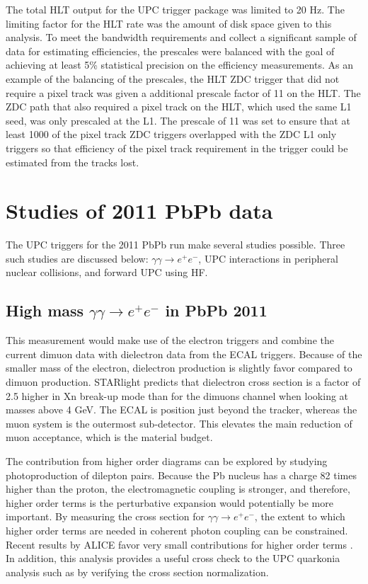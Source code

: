     The total HLT output for the UPC trigger package was limited to 20 Hz. 
    The limiting factor for the HLT rate was the amount of disk space given 
      to this analysis. 
    To meet the bandwidth requirements and collect a significant sample
      of data for estimating efficiencies, the prescales were balanced with 
      the goal of achieving at least 5\% statistical precision on the 
      efficiency measurements. 
    As an example of the balancing of the prescales, the HLT  ZDC trigger that 
      did not require a pixel track was given a additional prescale factor 
      of 11 on the HLT.
    The ZDC path that also required a pixel track on the HLT, which used 
      the same L1 seed, was only prescaled at the L1.
    The prescale of 11 was set to ensure that at least 1000 of the pixel track 
      ZDC triggers overlapped with the ZDC L1 only triggers so that efficiency
      of the pixel track requirement in the trigger could be estimated from 
      the tracks lost.

  \section{Studies of 2011 PbPb data}
    The UPC triggers for the 2011 PbPb run make several studies possible.
    Three such studies are discussed below: $\gamma\gamma \rightarrow e^{+} 
      e^{-}$, UPC interactions in peripheral nuclear collisions, and forward
      UPC \JPsi{} using HF. 

    \subsection{High mass $\gamma\gamma \rightarrow e^{+} e^{-}$  in PbPb 2011}
      This measurement would make use of the electron triggers and combine the 
        current dimuon data with dielectron data from the ECAL triggers.
      Because of the smaller mass of the electron,
        dielectron production is slightly favor compared to dimuon 
        production.
      STARlight predicts that dielectron cross section is a factor of 
        2.5 higher in Xn break-up mode than for the dimuons channel when looking 
        at masses above 4 GeV.
      The ECAL is position just beyond the tracker, whereas the muon system is 
        the outermost sub-detector. 
      This elevates the main reduction of muon acceptance, which is the material
        budget. 

      The contribution from higher order diagrams can be explored by studying 
        photoproduction of dilepton pairs.
      Because the Pb nucleus has a charge 82 times higher than the proton,
        the electromagnetic coupling is stronger, and therefore, higher
        order terms is the perturbative expansion would potentially be more 
        important.
      By measuring the cross section for $\gamma\gamma \rightarrow e^{+} e^{-}$,
        the extent to which higher order terms are needed in coherent photon
        coupling can be constrained. 
      Recent results by ALICE favor very small contributions for higher order
        terms \cite{}.
      In addition, this analysis provides a useful cross check to the UPC 
        quarkonia analysis such as \JPsi{} by verifying the cross section 
        normalization.

